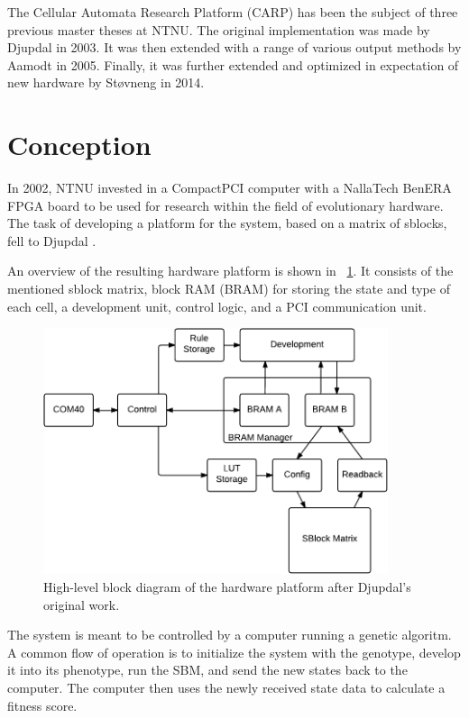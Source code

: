 The Cellular Automata Research Platform (CARP) has been the subject of three previous master theses at NTNU.
The original implementation was made by Djupdal in 2003.
It was then extended with a range of various output methods by Aamodt in 2005.
Finally, it was further extended and optimized in expectation of new hardware by Støvneng in 2014.

\section{Conception}

In 2002, NTNU invested in a CompactPCI computer with a NallaTech BenERA FPGA board to be used for research within the field of evolutionary hardware.
The task of developing a platform for the system, based on a matrix of sblocks, fell to Djupdal \cite{djupdal2003sblock}.

An overview of the resulting hardware platform is shown in \figurename~\ref{fig:overview-djupdal}.
It consists of the mentioned sblock matrix, block RAM (BRAM) for storing the state and type of each cell, a development unit, control logic, and a PCI communication unit.

\begin{figure}[!ht]
    \centering
    \includegraphics[width=0.9\textwidth]{figures/overview-djupdal}
    \caption[High-level block diagram of Djupdal's hardware platform.]{
        High-level block diagram of the hardware platform after Djupdal's original work.
    }
    \label{fig:overview-djupdal}
\end{figure}

The system is meant to be controlled by a computer running a genetic algoritm.
A common flow of operation is to initialize the system with the genotype, develop it into its phenotype, run the SBM, and send the new states back to the computer.
The computer then uses the newly received state data to calculate a fitness score.

